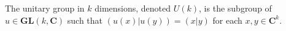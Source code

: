 The unitary group in $k$ dimensions, denoted $U(k)$, is the subgroup of $u \in \mathbf{GL}(k, \mathbf{C})$ such that $(u(x)|u(y)) = (x|y)$ for each $x, y \in \mathbf{C}^k$.
